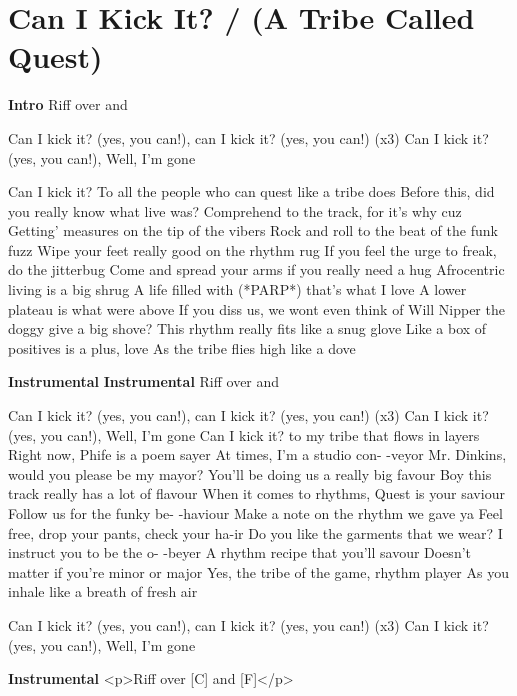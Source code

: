 \section{Can I Kick It? / (A Tribe Called Quest)}\label{sec:can_i_kick_it_}
\textbf{Intro}
Riff over and 

Can I kick it? (yes, you can!), can I kick it? (yes,
you can!) (x3)
Can I kick it? (yes, you can!), Well, I'm gone

Can I kick it? To all the people who can quest like a
tribe does
Before this, did you really know what live was?
Comprehend to the track, for it's why cuz
Getting' measures on the tip of the vibers
Rock and roll to the beat of the funk fuzz
Wipe your feet really good on the rhythm rug
If you feel the urge to freak, do the jitterbug
Come and spread your arms if you really need a hug
Afrocentric living is a big shrug
A life filled with (*PARP*) that's what I love
A lower plateau is what were above
If you diss us, we wont even think of
Will Nipper the doggy give a big shove?
This rhythm really fits like a snug glove
Like a box of positives is a plus, love
As the tribe flies high like a dove

\textbf{Instrumental}
\textbf{Instrumental}
Riff over and 

Can I kick it? (yes, you can!), can I kick it? (yes,
you can!) (x3)
Can I kick it? (yes, you can!), Well, I'm gone
Can I kick it? to my tribe that flows in layers
Right now, Phife is a poem sayer
At times, I'm a studio con- -veyor
Mr. Dinkins, would you please be my mayor?
You'll be doing us a really big favour
Boy this track really has a lot of flavour
When it comes to rhythms, Quest is your saviour
Follow us for the funky be- -haviour
Make a note on the rhythm we gave ya
Feel free, drop your pants, check your ha-ir
Do you like the garments that we wear?
I instruct you to be the o- -beyer
A rhythm recipe that you'll savour
Doesn't matter if you're minor or major
Yes, the tribe of the game, rhythm player
As you inhale like a breath of fresh air

Can I kick it? (yes, you can!), can I kick it? (yes,
you can!) (x3)
Can I kick it? (yes, you can!), Well, I'm gone


\textbf{Instrumental}
<p>Riff over [C] and [F]</p>
